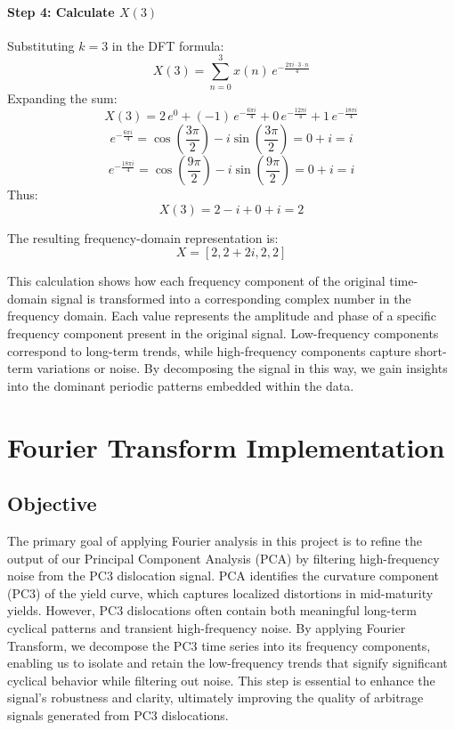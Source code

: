 \documentclass[12pt]{article}
\begin{document}
\paragraph{Step 4: Calculate \(X(3)\)}
Substituting \(k = 3\) in the DFT formula:
\[
X(3) = \sum_{n=0}^{3} x(n) \, e^{-\frac{2\pi i \cdot 3 \cdot n}{4}}
\]
Expanding the sum:
\[
X(3) = 2 \, e^{0} + (-1) \, e^{-\frac{6\pi i}{4}} + 0 \, e^{-\frac{12\pi i}{4}} + 1 \, e^{-\frac{18\pi i}{4}}
\]
\[
e^{-\frac{6\pi i}{4}} = \cos\left(\frac{3\pi}{2}\right) - i \sin\left(\frac{3\pi}{2}\right) = 0 + i = i
\]
\[
e^{-\frac{18\pi i}{4}} = \cos\left(\frac{9\pi}{2}\right) - i \sin\left(\frac{9\pi}{2}\right) = 0 + i = i
\]
Thus:
\[
X(3) = 2 - i + 0 + i = 2
\]

The resulting frequency-domain representation is:
\[
X = [2, 2 + 2i, 2, 2]
\]

This calculation shows how each frequency component of the original time-domain signal is transformed into a corresponding complex number in the frequency domain. Each value represents the amplitude and phase of a specific frequency component present in the original signal. Low-frequency components correspond to long-term trends, while high-frequency components capture short-term variations or noise. By decomposing the signal in this way, we gain insights into the dominant periodic patterns embedded within the data.




\section{Fourier Transform Implementation}

\subsection{Objective}
The primary goal of applying Fourier analysis in this project is to refine the output of our Principal Component Analysis (PCA) by filtering high-frequency noise from the PC3 dislocation signal. PCA identifies the curvature component (PC3) of the yield curve, which captures localized distortions in mid-maturity yields. However, PC3 dislocations often contain both meaningful long-term cyclical patterns and transient high-frequency noise. By applying Fourier Transform, we decompose the PC3 time series into its frequency components, enabling us to isolate and retain the low-frequency trends that signify significant cyclical behavior while filtering out noise. This step is essential to enhance the signal's robustness and clarity, ultimately improving the quality of arbitrage signals generated from PC3 dislocations.
\end{document}
